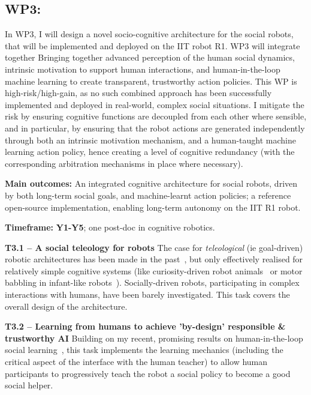 \documentclass[11pt,a4paper]{report}
\begin{document}
\subsection{WP3: \textbf{\wpThree}}

In WP3, I will design a novel socio-cognitive architecture for the
social robots, that will be implemented and deployed on the IIT robot R1.
WP3 will integrate together Bringing together advanced perception of the human social dynamics,
intrinsic motivation to support human interactions, and human-in-the-loop
machine learning to create transparent, trustworthy action policies. This WP is
high-risk/high-gain, as no such combined approach has been successfully
implemented and deployed in real-world, complex social situations. I mitigate
the risk by ensuring cognitive functions are decoupled from each other where
sensible, and in particular, by ensuring that the robot actions are generated
independently through both an intrinsic motivation mechanism, and a human-taught
machine learning action policy, hence creating a level of cognitive redundancy
(with the corresponding arbitration mechanisms in place where necessary).

\begin{framed}
    \textbf{Main outcomes:} An integrated cognitive architecture for social
    robots, driven by both long-term social goals, and machine-learnt action
    policies; a reference open-source implementation, enabling long-term
    autonomy on the IIT R1 robot.

    \textbf{Timeframe:} \textbf{Y1-Y5}; one post-doc in cognitive robotics.

\end{framed}

\textbf{T3.1 -- A social teleology for robots}
The case for \emph{teleological} (ie goal-driven) robotic architectures has been
made in the past~\cite{wrede2012towards}, but only effectively realised for
relatively simple cognitive systems (like curiosity-driven robot
animals~\cite{oudeyer2005playground} or motor babbling in infant-like
robots~\cite{forestier2017unified}). Socially-driven robots, participating in
complex interactions with humans, have been barely investigated. This task
covers the overall design of the architecture.


\textbf{T3.2 -- Learning from humans to achieve 'by-design' responsible \&
trustworthy AI} Building on my recent, promising results on human-in-the-loop
social learning~\cite{senft2017supervised,senft2019teaching,winkle2020couch}, this task
implements the learning mechanics (including the critical aspect of the
interface with the human teacher) to allow human participants to progressively
teach the robot a social policy to become a good social helper.
\end{document}
